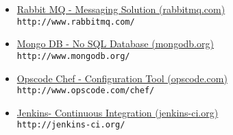\begin{itemize}
\item \href{http://www.rabbitmq.com/}{Rabbit MQ - Messaging Solution (rabbitmq.com)}\\
\verb?http://www.rabbitmq.com/?\\

\item \href{http://www.mongodb.org/}{Mongo DB - No SQL Database (mongodb.org)}\\
\verb?http://www.mongodb.org/?\\

\item \href{http://www.opscode.com/chef/}{Opscode Chef - Configuration Tool (opscode.com)}\\
\verb?http://www.opscode.com/chef/?\\

\item \href{http://jenkins-ci.org/}{Jenkins- Continuous Integration (jenkins-ci.org)}\\
\verb?http://jenkins-ci.org/?\\


\end{itemize}















